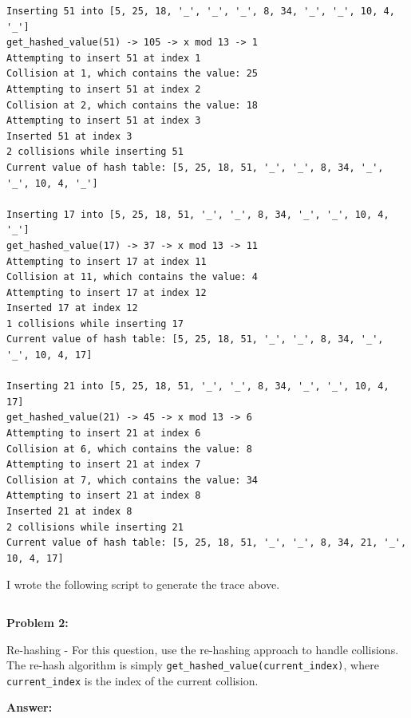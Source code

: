 \documentclass[10pt,letterpaper,final]{report}
\begin{document}
\begin{verbatim}
Inserting 51 into [5, 25, 18, '_', '_', '_', 8, 34, '_', '_', 10, 4, '_']
get_hashed_value(51) -> 105 -> x mod 13 -> 1
Attempting to insert 51 at index 1
Collision at 1, which contains the value: 25
Attempting to insert 51 at index 2
Collision at 2, which contains the value: 18
Attempting to insert 51 at index 3
Inserted 51 at index 3
2 collisions while inserting 51
Current value of hash table: [5, 25, 18, 51, '_', '_', 8, 34, '_', '_', 10, 4, '_']

Inserting 17 into [5, 25, 18, 51, '_', '_', 8, 34, '_', '_', 10, 4, '_']
get_hashed_value(17) -> 37 -> x mod 13 -> 11
Attempting to insert 17 at index 11
Collision at 11, which contains the value: 4
Attempting to insert 17 at index 12
Inserted 17 at index 12
1 collisions while inserting 17
Current value of hash table: [5, 25, 18, 51, '_', '_', 8, 34, '_', '_', 10, 4, 17]

Inserting 21 into [5, 25, 18, 51, '_', '_', 8, 34, '_', '_', 10, 4, 17]
get_hashed_value(21) -> 45 -> x mod 13 -> 6
Attempting to insert 21 at index 6
Collision at 6, which contains the value: 8
Attempting to insert 21 at index 7
Collision at 7, which contains the value: 34
Attempting to insert 21 at index 8
Inserted 21 at index 8
2 collisions while inserting 21
Current value of hash table: [5, 25, 18, 51, '_', '_', 8, 34, 21, '_', 10, 4, 17]
\end{verbatim}

\pagebreak

I wrote the following script to generate the trace above.

\inputminted[breaklines, breakanywhere, fontsize=\footnotesize, frame=single, fontsize=\footnotesize]{python}{problem1-hashing.py}

\pagebreak
\noindent\textbf{Problem 2:}
\medskip

Re-hashing - For this question, use the re-hashing approach to handle collisions. The re-hash algorithm is simply \texttt{get\_hashed\_value(current\_index)}, where \texttt{current\_index} is the index of the current collision.

\medskip
\noindent\textbf{Answer:}
\medskip
\end{document}
